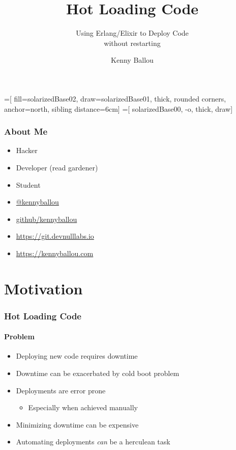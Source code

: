 \documentclass{beamer}
\title{Hot Loading Code}
\subtitle{Using Erlang/Elixir to Deploy Code \\{}
without restarting}
\author[Ballou]{Kenny Ballou}
\institute[/dev/null]{%
    \inst{}%
    /dev/null > labs
}
\begin{document}
=[%
    fill=solarizedBase02,
    draw=solarizedBase01,
    thick,
    rounded corners,
    anchor=north,
    sibling distance=6cm]
=[%
    solarizedBase00,
    -o,
    thick,
    draw]

\begin{frame}[label=titleslide]
\titlepage{}
\end{frame}

\begin{frame}
\tableofcontents[subsectionstyle=hide]
\end{frame}

\begin{frame}
\frametitle{About Me}
\begin{itemize}
\item{Hacker}
\item{Developer (read gardener)}
\item{Student}
\item{\href{https://twitter.com/kennyballou}{@kennyballou}}
\item{\href{https://github.com}{github/kennyballou}}
\item{\url{https://git.devnulllabs.io}}
\item{\url{https://kennyballou.com}}
\end{itemize}
\end{frame}

\section{Motivation}

\begin{frame}
\frametitle{Hot Loading Code}
\framesubtitle{Problem}
\begin{itemize}
\item{Deploying new code requires downtime}
\item{Downtime can be exacerbated by cold boot problem}
\item{Deployments are error prone}
\begin{itemize}
\item{Especially when achieved manually}
\end{itemize}
\item{Minimizing downtime can be expensive}
\item{Automating deployments \textit{can} be a herculean task}
\end{itemize}
\end{frame}
\end{document}
